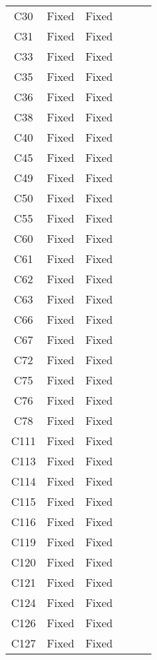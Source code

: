 \begin{table}[!t]
{\begin{tabular}{|c|c|c|c|c|c|}
C30               & Fixed     &Fixed   \\
C31               & Fixed     &Fixed   \\
C33               & Fixed     &Fixed   \\
C35               & Fixed     &Fixed   \\
C36               & Fixed     &Fixed   \\
C38               & Fixed     &Fixed   \\
C40               & Fixed     &Fixed   \\
C45               & Fixed     &Fixed   \\
C49               & Fixed     &Fixed   \\
C50               & Fixed     &Fixed   \\
C55               & Fixed     &Fixed   \\
C60               & Fixed     &Fixed   \\
C61               & Fixed     &Fixed   \\
C62               & Fixed     &Fixed   \\
C63               & Fixed     &Fixed   \\
C66               & Fixed     &Fixed   \\
C67               & Fixed     &Fixed   \\
C72               & Fixed     &Fixed   \\
C75               & Fixed     &Fixed   \\
C76               & Fixed     &Fixed   \\
C78               & Fixed     &Fixed   \\
C111              & Fixed     &Fixed   \\
C113              & Fixed     &Fixed   \\
C114              & Fixed     &Fixed   \\
C115              & Fixed     &Fixed   \\
C116              & Fixed     &Fixed   \\
C119              & Fixed     &Fixed   \\
C120              & Fixed     &Fixed   \\
C121              & Fixed     &Fixed   \\
C124              & Fixed     &Fixed   \\
C126              & Fixed     &Fixed   \\
C127              & Fixed     &Fixed   \\

\end{tabular}}
\end{table}
